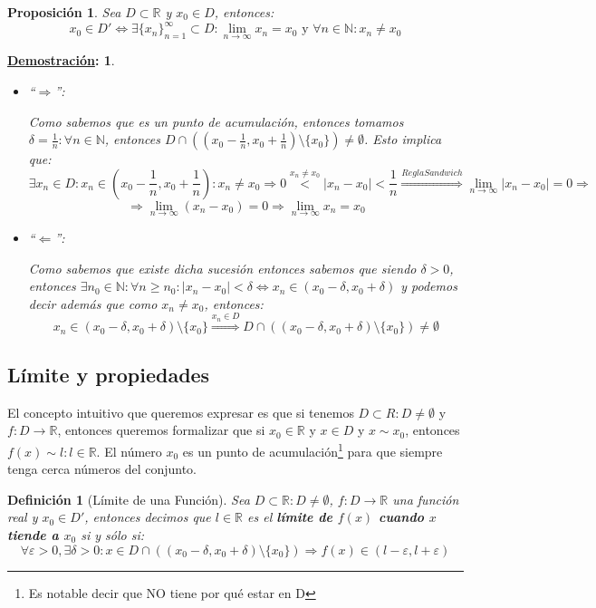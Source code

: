 \documentclass[10pt,a4paper,openright]{book}
\theoremstyle{break}
\newtheorem*{defi}{Definición}
\newtheorem*{prop}{Proposición}
\newtheorem*{demo}{\underline{Demostración}:}
\begin{document}
\begin{prop}
Sea $D\subset \mathbb R$ y $x_0\in D$, entonces:
$$x_0 \in D' \Leftrightarrow \exists \{x_n\}_{n=1}^\infty \subset D: \lim_{n\rightarrow \infty} x_n=x_0\mbox{ y } \forall n \in \mathbb{N} : x_n \neq x_0$$
\end{prop}
\begin{demo}
\begin{itemize}
\item ``$\Rightarrow $'':\par
Como sabemos que es un punto de acumulación, entonces tomamos $\delta=\frac{1}{n}: \forall n\in \mathbb N$, entonces $D\cap \left((x_0-\frac{1}{n}, x_0+\frac{1}{n})\mbox{\textbackslash} \{x_0\}\right)\neq \emptyset$. Esto implica que:
$$\exists x_n\in D: x_n\in \left(x_0-\frac{1}{n}, x_0+\frac{1}{n}\right): x_n\neq x_0\Rightarrow 0\stackrel{x_n\neq x_0}{<}|x_n-x_0|<\frac{1}{n} \stackrel{ReglaSandwich}{\Rightarrow} \lim_{n\rightarrow \infty} |x_n-x_0|=0\Rightarrow$$
$$\Rightarrow \lim_{n\rightarrow \infty} (x_n-x_0)=0\Rightarrow \lim_{n\rightarrow \infty} x_n=x_0$$

\item ``$\Leftarrow$'':\par
Como sabemos que existe dicha sucesión entonces sabemos que siendo $\delta >0$, entonces $\exists n_0\in \mathbb N: \forall n\geq n_0: |x_n-x_0|<\delta\Leftrightarrow x_n\in (x_0-\delta , x_0+\delta)$ y podemos decir además que como $x_n\neq x_0$, entonces:
$$x_n\in (x_0-\delta , x_0+\delta)\mbox{\textbackslash} \{x_0\}\stackrel{x_n\in D}{\Rightarrow} D\cap\left((x_0-\delta , x_0+\delta)\mbox{\textbackslash} \{x_0\}\right) \neq \emptyset$$
\end{itemize}
\end{demo}

\subsection{Límite y propiedades}
El concepto intuitivo que queremos expresar es que si tenemos $D\subset R: D\neq \emptyset$ y $f: D\longrightarrow \mathbb R$, entonces queremos formalizar que si $x_0\in \mathbb R$ y $x\in D$ y $x\sim x_0$, entonces $f(x)\sim l: l\in \mathbb R$. El número $x_0$ es un punto de acumulación\footnote{Es notable decir que NO tiene por qué estar en D} para que siempre tenga cerca números del conjunto.

\begin{defi}[Límite de una Función]
Sea $D\subset \mathbb R: D\neq \emptyset$, $f:D\longrightarrow \mathbb R$ una función real y $x_0\in D'$, entonces decimos que $l\in \mathbb R$ es el \textbf{límite de $f(x)$ cuando $x$ tiende a $x_0$} si y sólo si:
$$\forall \varepsilon>0, \exists \delta>0 : x\in D\cap \left((x_0-\delta, x_0+\delta)\mbox{\textbackslash} \{x_0\}\right)\Rightarrow f(x)\in (l-\varepsilon, l+\varepsilon)$$
\end{defi}
\end{document}

